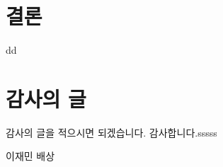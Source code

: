 \documentclass[master,korean,final]{cbnu-ecs}
\begin{document}
\chapter{결론}

dd



%
%
%

%
%
%


\chapter*{감사의 글}

감사의 글을 적으시면 되겠습니다.
감사합니다.sssss

\begin{flushright}
\vspace{1cm}
이재민 배상
\end{flushright}
\end{document}
